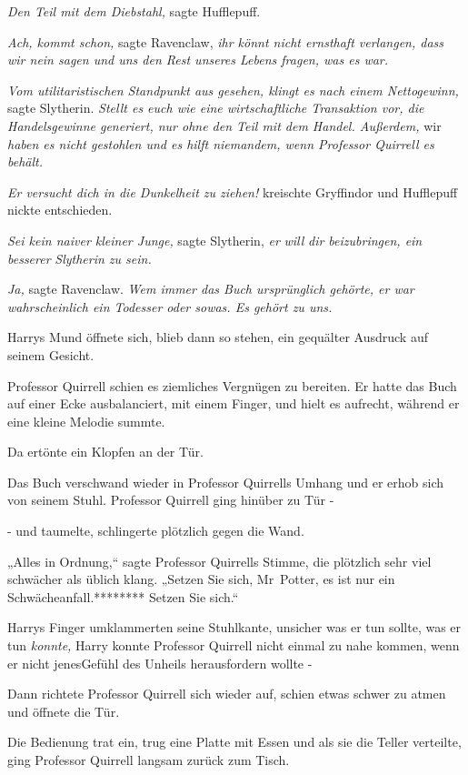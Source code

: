 {\emph{Den Teil mit dem Diebstahl,} sagte Hufflepuff.

\emph{Ach, kommt schon,} sagte Ravenclaw, \emph{ihr könnt nicht ernsthaft verlangen, dass wir nein sagen und uns den Rest unseres Lebens fragen, was es war.}

\emph{Vom utilitaristischen Standpunkt aus gesehen, klingt es nach einem Nettogewinn,} sagte Slytherin. \emph{Stellt es euch wie eine wirtschaftliche Transaktion vor, die Handelsgewinne generiert, nur ohne den Teil mit dem Handel. Außerdem,} wir \emph{haben es nicht gestohlen und es hilft niemandem, wenn Professor Quirrell es behält.}

\emph{Er versucht dich in die Dunkelheit zu ziehen!} kreischte Gryffindor und Hufflepuff nickte entschieden.

\emph{Sei kein naiver kleiner Junge,} sagte Slytherin, \emph{er} \emph{will} \emph{dir beizubringen, ein} \emph{besserer} \emph{Slytherin zu sein.}

\emph{Ja,} sagte Ravenclaw. \emph{Wem immer das Buch ursprünglich gehörte, er war wahrscheinlich ein Todesser oder sowas. Es gehört zu uns.}

Harrys Mund öffnete sich, blieb dann so stehen, ein gequälter Ausdruck auf seinem Gesicht.

Professor Quirrell schien es ziemliches Vergnügen zu bereiten. Er hatte das Buch auf einer Ecke ausbalanciert, mit einem Finger, und hielt es aufrecht, während er eine kleine Melodie summte.

Da ertönte ein Klopfen an der Tür.

Das Buch verschwand wieder in Professor Quirrells Umhang und er erhob sich von seinem Stuhl. Professor Quirrell ging hinüber zu Tür -

- und taumelte, schlingerte plötzlich gegen die Wand.

„Alles in Ordnung,“ sagte Professor Quirrells Stimme, die plötzlich sehr viel schwächer als üblich klang. „Setzen Sie sich, Mr~Potter, es ist nur ein Schwächeanfall.******** Setzen Sie sich.“

Harrys Finger umklammerten seine Stuhlkante, unsicher was er tun sollte, was er tun \emph{konnte,} Harry konnte Professor Quirrell nicht einmal zu nahe kommen, wenn er nicht jenesGefühl des Unheils herausfordern wollte -

Dann richtete Professor Quirrell sich wieder auf, schien etwas schwer zu atmen und öffnete die Tür.

Die Bedienung trat ein, trug eine Platte mit Essen und als sie die Teller verteilte, ging Professor Quirrell langsam zurück zum Tisch.

}
